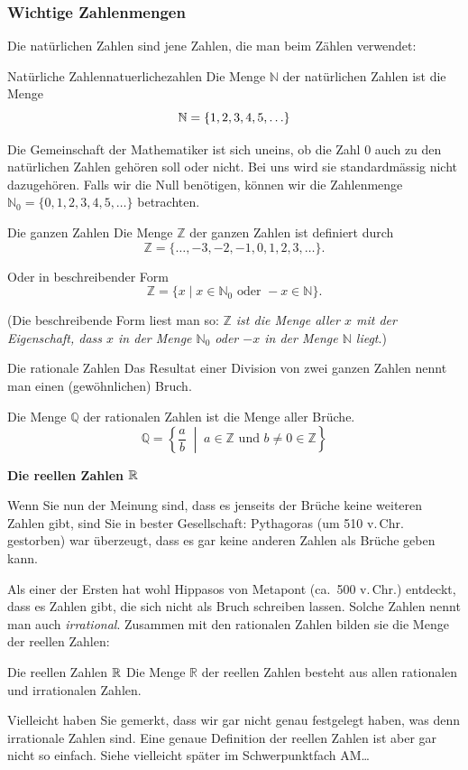 \subsubsection{Wichtige Zahlenmengen}
Die natürlichen Zahlen sind jene Zahlen, die man beim Zählen verwendet:
\begin{definition}{Natürliche Zahlen}{natuerlichezahlen}
    Die Menge \(\mathbb{N}\) der natürlichen Zahlen ist die Menge
    \[ \mathbb{N} = \{1, 2, 3, 4, 5, \ldots\} \]
\end{definition}
Die Gemeinschaft der Mathematiker ist sich uneins, ob die Zahl \(0\) auch zu den natürlichen Zahlen gehören soll oder nicht. Bei uns wird sie standardmässig nicht dazugehören. Falls wir die Null benötigen, können wir die Zahlenmenge \(\mathbb{N}_0 = \{0, 1, 2, 3, 4, 5, \ldots\}\) betrachten.

\begin{definition}{Die ganzen Zahlen}{}
    Die Menge \(\mathbb{Z}\) der ganzen Zahlen ist definiert durch
    \[
        \mathbb{Z} = \{\ldots, -3, -2, -1, 0, 1, 2, 3, \ldots\}.
    \]

    Oder in beschreibender Form
    \[
        \mathbb{Z} = \{x \mid x \in \mathbb{N}_0 \text{ oder } -x \in \mathbb{N}\}.
    \]

    (Die beschreibende Form liest man so: \textit{\(\mathbb{Z}\) ist die Menge aller \(x\) mit der Eigenschaft, dass \(x\) in der Menge \(\mathbb{N}_0\) oder \(-x\) in der Menge \(\mathbb{N}\) liegt}.)
\end{definition}

\begin{definition}
    {Die rationale Zahlen}{}
    Das Resultat einer Division von zwei ganzen Zahlen nennt man einen (gewöhnlichen) Bruch.

    Die Menge \(\mathbb{Q}\) der rationalen Zahlen ist die Menge aller Brüche.
    \[
        \mathbb{Q}
        =
        \left\{
        \frac{a}{b}
        \;\middle|\;
        a \in \mathbb{Z}
        \text{ und }
        b \neq 0 \in \mathbb{Z}
        \right\}
    \]
\end{definition}

\textbf{Die reellen Zahlen \(\mathbb{R}\) }

Wenn Sie nun der Meinung sind, dass es jenseits der Brüche keine weiteren Zahlen gibt, sind Sie in bester Gesellschaft: Pythagoras (um 510 v.\,Chr. gestorben) war überzeugt, dass es gar keine anderen Zahlen als Brüche geben kann.

Als einer der Ersten hat wohl Hippasos von Metapont (ca.\ 500 v.\,Chr.) entdeckt, dass es Zahlen gibt, die sich nicht als Bruch schreiben lassen. Solche Zahlen nennt man auch \textit{irrational}. Zusammen mit den rationalen Zahlen bilden sie die Menge der reellen Zahlen:
\begin{definition}
    {Die reellen Zahlen \(\mathbb{R}\)}{}
    Die Menge \(\mathbb{R}\) der reellen Zahlen besteht aus allen rationalen und irrationalen Zahlen.
\end{definition}
Vielleicht haben Sie gemerkt, dass wir gar nicht genau festgelegt haben, was denn irrationale Zahlen sind. Eine genaue Definition der reellen Zahlen ist aber gar nicht so einfach. Siehe vielleicht später im Schwerpunktfach AM\dots


